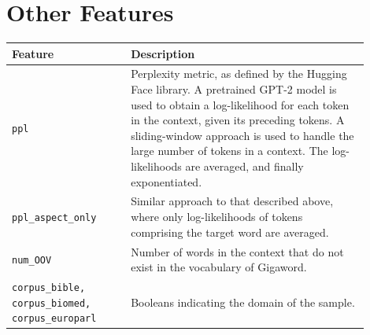 \documentclass{dcthesis}
\theoremstyle{definition}
\theoremstyle{remark}
\begin{document}
\section{Other Features}

\begin{table}[H]
  \centering
  \begin{tabular}{>{\centering\arraybackslash}p{0.3\linewidth}>{\arraybackslash}p{0.6\linewidth}}
    \hline \textbf{Feature} & \textbf{Description} \\ \hline 
    \texttt{ppl} & Perplexity metric, as defined by the Hugging Face library.\tablefootnote{\url{https://huggingface.co/transformers/perplexity.html}} A pretrained GPT-2 model is used to obtain a log-likelihood for each token in the context, given its preceding tokens. A sliding-window approach is used to handle the large number of tokens in a context. The log-likelihoods are averaged, and finally exponentiated.\\
    \hline 
    \texttt{ppl\_aspect\_only} & Similar approach to that described above, where only log-likelihoods of tokens comprising the target word are averaged.\\
    \hline 
    \texttt{num\_OOV} & Number of words in the context that do not exist in the vocabulary of Gigaword.\\
    \hline 
    \texttt{corpus\_bible, corpus\_biomed, corpus\_europarl} & Booleans indicating the domain of the sample.\\
    \hline 
  \end{tabular}
  \label{other_features}
\end{table}

\backmatter





\end{document}
